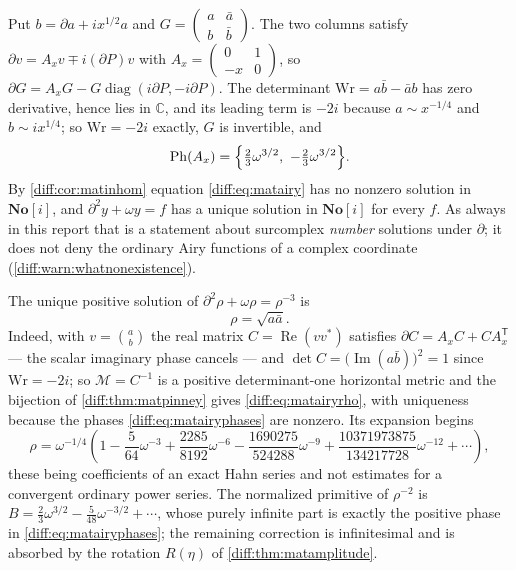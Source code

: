 \documentclass[11pt,letterpaper]{article}
\numberwithin{equation}{section}
\theoremstyle{definition}
\theoremstyle{remark}
\newcommand{\SC}{\mathbf{No}[i]}
\newcommand{\C}{\mathbb C}
\newcommand{\der}{\partial}
\newcommand{\Ree}{\operatorname{Re}}
\newcommand{\Imm}{\operatorname{Im}}
\newcommand{\Ph}{\operatorname{Ph}}
\begin{document}
Put $b=\der a+ix^{1/2}a$ and $G=\left(\begin{smallmatrix}a&\bar a\\
b&\bar b\end{smallmatrix}\right)$. The two columns satisfy
$\der v=A_{x}v\mp i(\der P)v$ with
$A_{x}=\left(\begin{smallmatrix}0&1\\-x&0\end{smallmatrix}\right)$, so
$\der G=A_{x}G-G\operatorname{diag}(i\der P,-i\der P)$. The determinant
$\mathrm{Wr}=a\bar b-\bar ab$ has zero derivative, hence lies in $\C$, and its
leading term is $-2i$ because $a\sim x^{-1/4}$ and $b\sim ix^{1/4}$; so
$\mathrm{Wr}=-2i$ exactly, $G$ is invertible, and
\begin{equation}\label{diff:eq:matairyphases}
 \Ph(A_{x})=\Bigl\{\tfrac23\omega^{3/2},\ -\tfrac23\omega^{3/2}\Bigr\}.
\end{equation}
By \cref{diff:cor:matinhom} equation \cref{diff:eq:matairy} has no nonzero
solution in $\SC$, and $\der^{2}y+\omega y=f$ has a unique solution in $\SC$
for every $f$. As always in this report that is a statement about surcomplex
\emph{number} solutions under $\der$; it does not deny the ordinary Airy
functions of a complex coordinate (\cref{diff:warn:whatnonexistence}).

The unique positive solution of $\der^{2}\rho+\omega\rho=\rho^{-3}$ is
\begin{equation}\label{diff:eq:matairyrho}
 \rho=\sqrt{a\bar a}.
\end{equation}
Indeed, with $v=\binom ab$ the real matrix $C=\Ree(vv^{*})$ satisfies
$\der C=A_{x}C+CA_{x}^{\mathsf T}$ --- the scalar imaginary phase cancels ---
and $\det C=\bigl(\Imm(a\bar b)\bigr)^{2}=1$ since $\mathrm{Wr}=-2i$; so
$\mathcal M=C^{-1}$ is a positive determinant-one horizontal metric and the
bijection of \cref{diff:thm:matpinney} gives
\cref{diff:eq:matairyrho}, with uniqueness because the phases
\cref{diff:eq:matairyphases} are nonzero. Its expansion begins
\begin{equation}\label{diff:eq:matairyjet}
 \rho=\omega^{-1/4}\left(
 1-\frac{5}{64}\omega^{-3}
 +\frac{2285}{8192}\omega^{-6}
 -\frac{1690275}{524288}\omega^{-9}
 +\frac{10371973875}{134217728}\omega^{-12}+\cdots\right),
\end{equation}
these being coefficients of an exact Hahn series and not estimates for a
convergent ordinary power series. The normalized primitive of $\rho^{-2}$ is
$B=\tfrac23\omega^{3/2}-\tfrac{5}{48}\omega^{-3/2}+\cdots$, whose purely
infinite part is exactly the positive phase in
\cref{diff:eq:matairyphases}; the remaining correction is infinitesimal and is
absorbed by the rotation $R(\eta)$ of \cref{diff:thm:matamplitude}.
\end{document}
